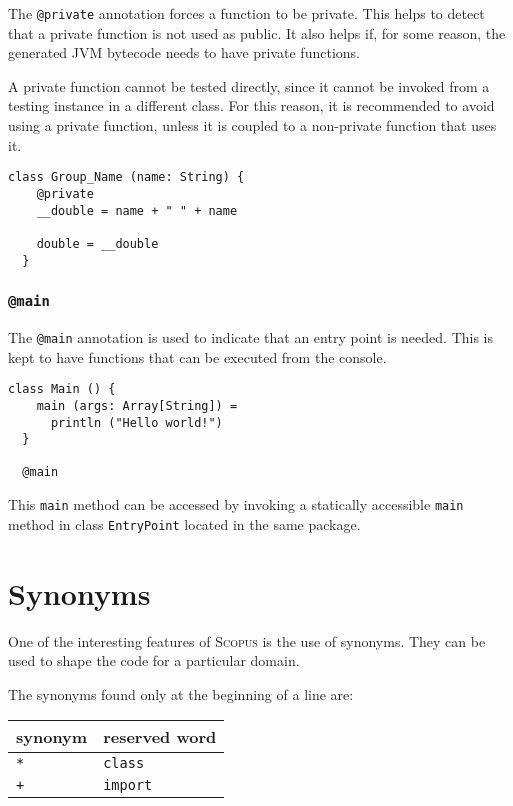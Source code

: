 \documentclass[12pt,a4paper]{book}
\makeatletter
\newcommand{\srccode}[1]{\texttt{{#1}}}
\newcommand{\reservedWord}[1]{{\color{blue}\srccode{#1}}\xspace}
\newcommand{\annotation}[1]{{\color{brown}\srccode{#1}}\xspace}
\newcommand{\sclass}{\reservedWord{class}}
\newcommand{\simport}{\reservedWord{import}}
\newcommand{\sprivate}{\annotation{@private}}
\newcommand{\smain}{\annotation{@main}}
\newcommand{\sasterisk}{\srccode{*}}
\newcommand{\splus}{\srccode{+}}
\newcommand{\Scopus}{\textsc{Scopus}\xspace}
\makeatother
\begin{document}
    The \sprivate annotation forces a function to be private.
    This helps to detect that a private function is not used as public.
    It also helps if, for some reason, the generated JVM bytecode needs to have private functions.

    A private function cannot be tested directly, since it cannot be invoked from a testing instance in a different class.
    For this reason, it is recommended to avoid using a private function, unless it is coupled to a non-private function that uses it.

    \begin{lstlisting}[label={lst:examplePrivate}]
  class Group_Name (name: String) {
    @private
    __double = name + " " + name

    double = __double
  }
    \end{lstlisting}

    \subsubsection{\smain}

    The \smain annotation is used to indicate that an entry point is needed.
    This is kept to have functions that can be executed from the console.

    \begin{lstlisting}[label={lst:exampleMain}]
  class Main () {
    main (args: Array[String]) =
      println ("Hello world!")
  }

  @main
    \end{lstlisting}

    This \srccode{main} method can be accessed by invoking a statically accessible \srccode{main} method in class \srccode{EntryPoint} located in the same package.


    \section{Synonyms}

    One of the interesting features of \Scopus is the use of synonyms.
    They can be used to shape the code for a particular domain.

    The synonyms found only at the beginning of a line are:

    \begin{center}
        \begin{tabular}{|ll|}
            \hline
            \textbf{synonym} & \textbf{reserved word} \\
            \hline
            \sasterisk       & \sclass                \\
            \hline
            \splus           & \simport               \\
            \hline
        \end{tabular}
    \end{center}
\end{document}
